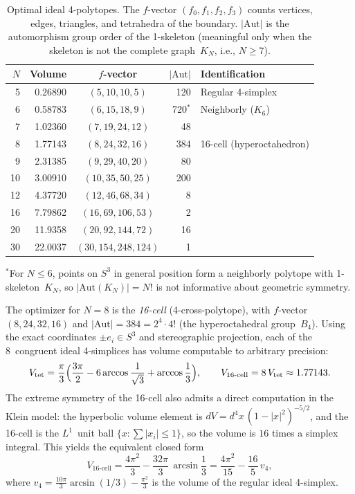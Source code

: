 \documentclass[11pt]{article}
\begin{document}
\begin{table}[t]
\centering
\caption{Optimal ideal 4-polytopes.  The $f$-vector
$(f_0, f_1, f_2, f_3)$ counts vertices, edges, triangles, and
tetrahedra of the boundary.  $|\mathrm{Aut}|$ is the automorphism
group order of the 1-skeleton (meaningful only when the skeleton
is not the complete graph~$K_N$, i.e., $N \ge 7$).}
\label{tab:opt4d}
\smallskip
\begin{tabular}{@{}rrcrl@{}}
\toprule
$N$ & Volume & $f$-vector & $|\mathrm{Aut}|$ & Identification \\
\midrule
 5  & 0.26890 & $(5,10,10,5)$      & 120 & Regular 4-simplex \\
 6  & 0.58783 & $(6,15,18,9)$      & 720$^*$ & Neighborly ($K_6$) \\
 7  & 1.02360 & $(7,19,24,12)$     &  48 & \\
 8  & 1.77143 & $(8,24,32,16)$     & 384 & 16-cell (hyperoctahedron) \\
 9  & 2.31385 & $(9,29,40,20)$     &  80 & \\
10  & 3.00910 & $(10,35,50,25)$    & 200 & \\
12  & 4.37720 & $(12,46,68,34)$    &   8 & \\
16  & 7.79862 & $(16,69,106,53)$   &   2 & \\
20  & 11.9358 & $(20,92,144,72)$   &  16 & \\
30  & 22.0037 & $(30,154,248,124)$ &   1 & \\
\bottomrule
\end{tabular}
\smallskip

{\footnotesize $^*$For $N \le 6$, points on $S^3$ in general
position form a neighborly polytope with 1-skeleton~$K_N$, so
$|\mathrm{Aut}(K_N)| = N!$ is not informative about geometric
symmetry.}
\end{table}

The optimizer for $N = 8$ is the \emph{16-cell}
(4-cross-polytope), with $f$-vector $(8,24,32,16)$ and
$|\mathrm{Aut}| = 384 = 2^4 \cdot 4!$ (the hyperoctahedral
group~$B_4$).  Using the exact coordinates $\pm e_i \in S^3$
and stereographic projection, each of the 8~congruent ideal
4-simplices has volume computable to arbitrary precision:
\[
  V_{\mathrm{tet}} = \frac{\pi}{3}\Bigl(\frac{3\pi}{2}
  - 6\arccos\frac{1}{\sqrt{3}} + \arccos\frac{1}{3}\Bigr),
  \qquad
  V_{\mathrm{16\text{-}cell}} = 8\,V_{\mathrm{tet}}
  \approx 1.77143.
\]
The extreme symmetry of the 16-cell also admits a direct
computation in the Klein model: the hyperbolic volume
element is $dV = d^4x\,(1 - |x|^2)^{-5/2}$, and the
16-cell is the $L^1$~unit ball $\{x : \sum|x_i| \le 1\}$,
so the volume is $16$ times a simplex integral.  This yields
the equivalent closed form
\begin{equation}\label{eq:16cell}
  V_{\mathrm{16\text{-}cell}}
  = \frac{4\pi^2}{3} - \frac{32\pi}{3}\,\arcsin\frac{1}{3}
  = \frac{4\pi^2}{15} - \frac{16}{5}\,v_4,
\end{equation}
where $v_4 = \frac{10\pi}{3}\arcsin(1/3) - \frac{\pi^2}{3}$
is the volume of the regular ideal 4-simplex.
\end{document}
